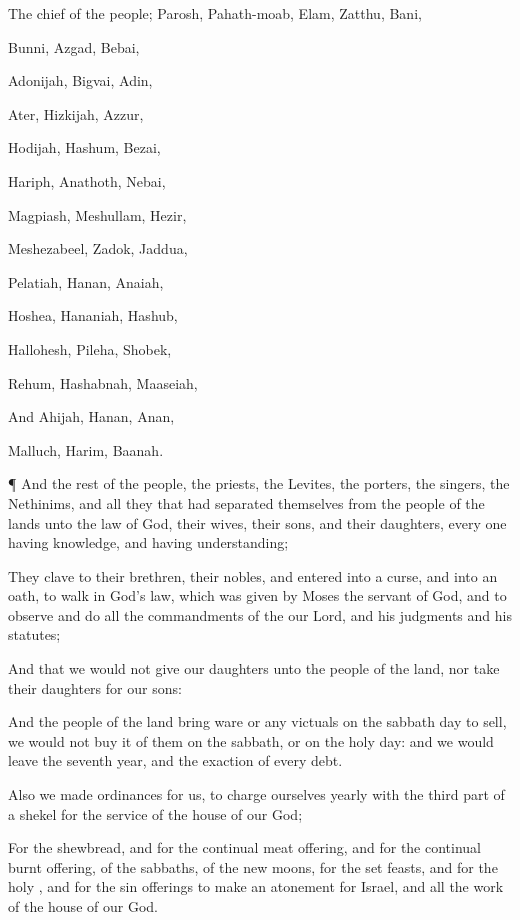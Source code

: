 {The
chief of the
people;
Parosh,
Pahath-moab,
Elam,
Zatthu,
Bani,

Bunni,
Azgad,
Bebai,

Adonijah,
Bigvai,
Adin,

Ater,
Hizkijah,
Azzur,

Hodijah,
Hashum,
Bezai,

Hariph,
Anathoth,
Nebai,

Magpiash,
Meshullam,
Hezir,

Meshezabeel,
Zadok,
Jaddua,

Pelatiah,
Hanan,
Anaiah,

Hoshea,
Hananiah,
Hashub,

Hallohesh,
Pileha,
Shobek,

Rehum,
Hashabnah,
Maaseiah,

And
Ahijah,
Hanan,
Anan,

Malluch,
Harim,
Baanah.


\par }{\PP {}¶ And the
rest of the
people, the
priests, the
Levites, the
porters, the
singers, the
Nethinims, and all they that had
separated themselves from the
people of the
lands unto the
law of
God, their
wives, their
sons, and their
daughters, every one having
knowledge, and having
understanding;

They
clave to their
brethren, their
nobles, and
entered into a
curse, and into an
oath, to
walk in
God’s
law, which was
given
by
Moses the
servant of
God, and to
observe and
do all the
commandments of the
{} our
Lord, and his
judgments and his
statutes;

And that we would not
give our
daughters unto the
people of the
land, nor
take their
daughters for our
sons:

And
{} the
people of the
land
bring
ware or any
victuals on the
sabbath
day to
sell,
{} we would not
buy it of them on the
sabbath, or on the
holy
day: and
{} we would
leave the
seventh
year, and the
exaction of every
debt.


\par }{\PP {}Also we
made
ordinances for us, to
charge ourselves
yearly with the third
part of a
shekel for the
service of the
house of our
God;

For the
shewbread, and for the
continual meat
offering, and for the
continual burnt
offering, of the
sabbaths, of the new
moons, for the set
feasts, and for the
holy
{}, and for the sin
offerings to make an
atonement for
Israel, and
{} all the
work of the
house of our
God.

}
